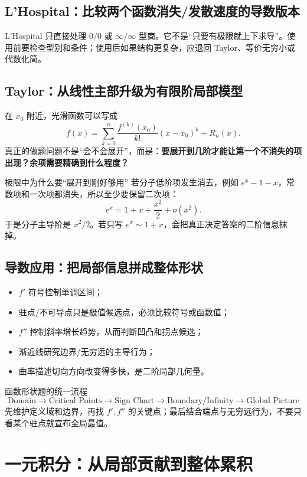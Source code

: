 \documentclass[11pt,a4paper,openany]{ctexbook}
\newcommand{\key}[1]{\textbf{\color{deep}#1}}
\begin{document}
\section{L'Hospital：比较两个函数消失/发散速度的导数版本}
L'Hospital 只直接处理 $0/0$ 或 $\infty/\infty$ 型商。它不是“只要有极限就上下求导”。使用前要检查型别和条件；使用后如果结构更复杂，应退回 Taylor、等价无穷小或代数化简。

\section{Taylor：从线性主部升级为有限阶局部模型}
在 $x_0$ 附近，光滑函数可以写成
\[
f(x)=\sum_{k=0}^{n}\frac{f^{(k)}(x_0)}{k!}(x-x_0)^k+R_n(x).
\]
真正的做题问题不是“会不会展开”，而是：\key{要展开到几阶才能让第一个不消失的项出现？余项需要精确到什么程度？}

\begin{examplebox}{极限中为什么要“展开到刚好够用”}
若分子低阶项发生消去，例如 $e^x-1-x$，常数项和一次项都消失，所以至少要保留二次项：
\[
e^x=1+x+\frac{x^2}{2}+o(x^2).
\]
于是分子主导阶是 $x^2/2$。若只写 $e^x\sim1+x$，会把真正决定答案的二阶信息抹掉。
\end{examplebox}

\section{导数应用：把局部信息拼成整体形状}
\begin{itemize}
  \item $f'$ 符号控制单调区间；
  \item 驻点/不可导点只是极值候选点，必须比较符号或函数值；
  \item $f''$ 控制斜率增长趋势，从而判断凹凸和拐点候选；
  \item 渐近线研究边界/无穷远的主导行为；
  \item 曲率描述切向方向改变得多快，是二阶局部几何量。
\end{itemize}

\begin{examBox}{函数形状题的统一流程}
\[
\boxed{\text{Domain}\to\text{Critical Points}\to\text{Sign Chart}\to\text{Boundary/Infinity}\to\text{Global Picture}}
\]
先维护定义域和边界，再找 $f',f''$ 的关键点；最后结合端点与无穷远行为，不要只看某个驻点就宣布全局最值。
\end{examBox}

\chapter{一元积分：从局部贡献到整体累积}
\end{document}
